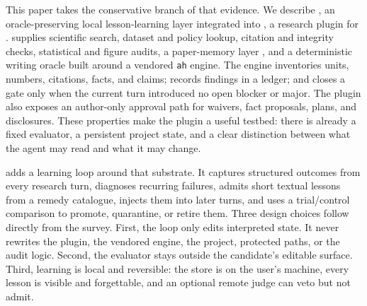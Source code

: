 This paper takes the conservative branch of that evidence. We describe \system{}, an oracle-preserving local lesson-learning layer integrated into \ah{}, a research plugin for \dsh{} \citep{academicharness2026,deepseek2026harness}. \ah{} supplies scientific search, dataset and policy lookup, citation and integrity checks, statistical and figure audits, a paper-memory layer \citep{papermemory2026}, and a deterministic writing oracle built around a vendored \texttt{ah} engine. The engine inventories units, numbers, citations, facts, and claims; records findings in a ledger; and closes a gate only when the current turn introduced no open blocker or major. The plugin also exposes an author-only approval path for waivers, fact proposals, plans, and disclosures. These properties make the plugin a useful testbed: there is already a fixed evaluator, a persistent project state, and a clear distinction between what the agent may read and what it may change.

\system{} adds a learning loop around that substrate. It captures structured outcomes from every research turn, diagnoses recurring failures, admits short textual lessons from a remedy catalogue, injects them into later turns, and uses a trial/control comparison to promote, quarantine, or retire them. Three design choices follow directly from the survey. First, the loop only edits interpreted state. It never rewrites the plugin, the vendored engine, the project, protected paths, or the audit logic. Second, the evaluator stays outside the candidate's editable surface. Third, learning is local and reversible: the store is on the user's machine, every lesson is visible and forgettable, and an optional remote judge can veto but not admit.

